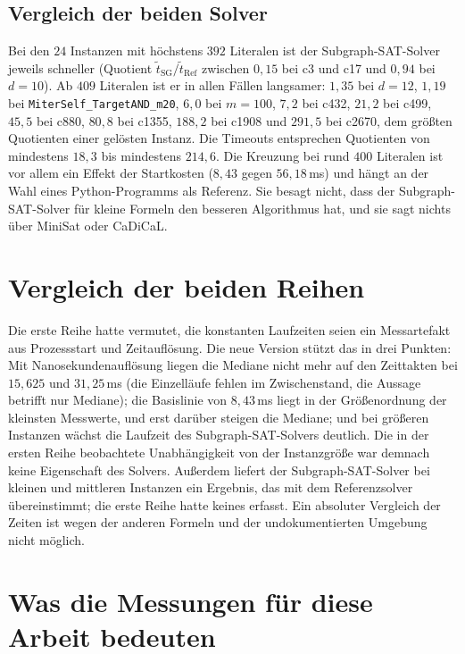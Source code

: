 \subsection{Vergleich der beiden Solver}
\label{sec:exp_vergleich_solver}

Bei den $24$ Instanzen mit höchstens $392$ Literalen ist der Subgraph-SAT-Solver jeweils schneller (Quotient $\tilde t_{\mathrm{SG}}/\tilde t_{\mathrm{Ref}}$ zwischen $0{,}15$ bei c3 und c17 und $0{,}94$ bei $d=10$). Ab $409$ Literalen ist er in allen Fällen langsamer: $1{,}35$ bei $d=12$, $1{,}19$ bei \texttt{MiterSelf\_TargetAND\_m20}, $6{,}0$ bei $m=100$, $7{,}2$ bei c432, $21{,}2$ bei c499, $45{,}5$ bei c880, $80{,}8$ bei c1355, $188{,}2$ bei c1908 und $291{,}5$ bei c2670, dem größten Quotienten einer gelösten Instanz. Die Timeouts entsprechen Quotienten von mindestens $18{,}3$ bis mindestens $214{,}6$. Die Kreuzung bei rund $400$ Literalen ist vor allem ein Effekt der Startkosten ($8{,}43$ gegen $56{,}18$\,ms) und hängt an der Wahl eines Python-Programms als Referenz. Sie besagt nicht, dass der Subgraph-SAT-Solver für kleine Formeln den besseren Algorithmus hat, und sie sagt nichts über MiniSat oder CaDiCaL.

\section{Vergleich der beiden Reihen}
\label{sec:exp_vergleich_reihen}

Die erste Reihe hatte vermutet, die konstanten Laufzeiten seien ein Messartefakt aus Prozessstart und Zeitauflösung. Die neue Version stützt das in drei Punkten: Mit Nanosekundenauflösung liegen die Mediane nicht mehr auf den Zeittakten bei $15{,}625$ und $31{,}25$\,ms (die Einzelläufe fehlen im Zwischenstand, die Aussage betrifft nur Mediane); die Basislinie von $8{,}43$\,ms liegt in der Größenordnung der kleinsten Messwerte, und erst darüber steigen die Mediane; und bei größeren Instanzen wächst die Laufzeit des Subgraph-SAT-Solvers deutlich. Die in der ersten Reihe beobachtete Unabhängigkeit von der Instanzgröße war demnach keine Eigenschaft des Solvers. Außerdem liefert der Subgraph-SAT-Solver bei kleinen und mittleren Instanzen ein Ergebnis, das mit dem Referenzsolver übereinstimmt; die erste Reihe hatte keines erfasst. Ein absoluter Vergleich der Zeiten ist wegen der anderen Formeln und der undokumentierten Umgebung nicht möglich.

\section{Was die Messungen für diese Arbeit bedeuten}
\label{sec:exp_bedeutung}

